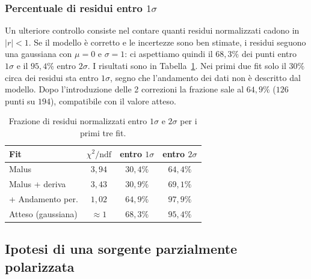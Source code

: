 \documentclass[10pt,twocolumn]{article}
\begin{document}
      \subsubsection{Percentuale di residui entro $1\sigma$}
      Un ulteriore controllo consiste nel contare quanti residui normalizzati cadono in $|r|<1$. Se il modello è corretto e le incertezze sono ben stimate, i residui seguono una gaussiana con $\mu=0$ e $\sigma=1$:
      ci aspettiamo quindi il $68{,}3\%$ dei punti entro $1\sigma$ e il $95{,}4\%$ entro $2\sigma$. I risultati sono in Tabella~\ref{tab:sigma}.
      Nei primi due fit solo il $30\%$ circa dei residui sta entro $1\sigma$, segno che l'andamento dei dati non è descritto dal modello. Dopo l'introduzione delle 2 correzioni la frazione sale al $64{,}9\%$ ($126$ punti su $194$),
      compatibile con il valore atteso.
      \begin{table}[H]
        \centering
        \small
        \begin{tabular}{lccc}
          \toprule
          Fit & $\chi^2/\mathrm{ndf}$ & entro $1\sigma$ & entro $2\sigma$ \\
          \midrule
          Malus                  & $3{,}94$ & $30{,}4\%$ & $64{,}4\%$ \\
          Malus + deriva         & $3{,}43$ & $30{,}9\%$ & $69{,}1\%$ \\
          + Andamento per.          & $1{,}02$ & $64{,}9\%$ & $97{,}9\%$ \\
          \midrule
          Atteso (gaussiana)     & $\approx 1$ & $68{,}3\%$ & $95{,}4\%$ \\
          \bottomrule
        \end{tabular}
        \caption{Frazione di residui normalizzati entro $1\sigma$ e $2\sigma$ per i primi tre fit.}
        \label{tab:sigma}
      \end{table}

      


      \subsection{Ipotesi di una sorgente parzialmente polarizzata}
 
\end{document}
